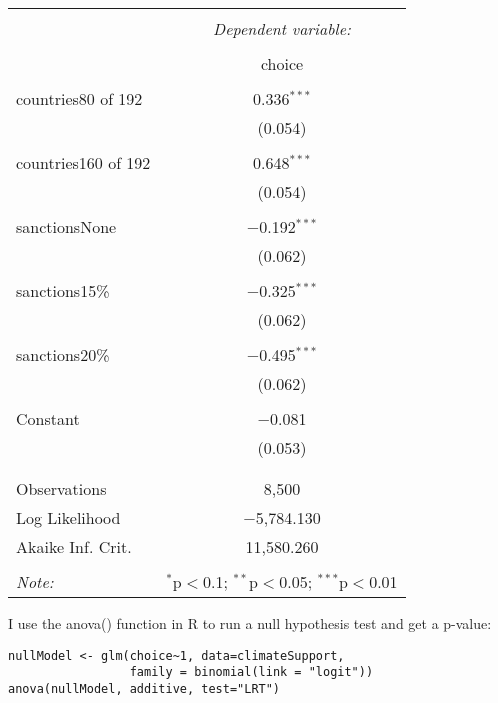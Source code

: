\documentclass{article}
\begin{document}
\begin{table}[H] \centering 
  \caption{} 
  \label{} 
\begin{tabular}{@{\extracolsep{5pt}}lc} 
\\[-1.8ex]\hline 
\hline \\[-1.8ex] 
 & \multicolumn{1}{c}{\textit{Dependent variable:}} \\ 
\cline{2-2} 
\\[-1.8ex] & choice \\ 
\hline \\[-1.8ex] 
 countries80 of 192 & 0.336$^{***}$ \\ 
  & (0.054) \\ 
  & \\ 
 countries160 of 192 & 0.648$^{***}$ \\ 
  & (0.054) \\ 
  & \\ 
 sanctionsNone & $-$0.192$^{***}$ \\ 
  & (0.062) \\ 
  & \\ 
 sanctions15\% & $-$0.325$^{***}$ \\ 
  & (0.062) \\ 
  & \\ 
 sanctions20\% & $-$0.495$^{***}$ \\ 
  & (0.062) \\ 
  & \\ 
 Constant & $-$0.081 \\ 
  & (0.053) \\ 
  & \\ 
\hline \\[-1.8ex] 
Observations & 8,500 \\ 
Log Likelihood & $-$5,784.130 \\ 
Akaike Inf. Crit. & 11,580.260 \\ 
\hline 
\hline \\[-1.8ex] 
\textit{Note:}  & \multicolumn{1}{r}{$^{*}$p$<$0.1; $^{**}$p$<$0.05; $^{***}$p$<$0.01} \\ 
\end{tabular} 
\end{table} 

I use the anova() function in R to run a null hypothesis test and get a p-value: 
\begin{verbatim}
nullModel <- glm(choice~1, data=climateSupport, 
                 family = binomial(link = "logit"))
anova(nullModel, additive, test="LRT")
\end{verbatim}
\end{document}
